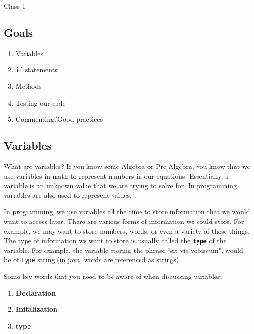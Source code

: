 \documentclass[11pt,fleqn]{article}
\begin{document}
\begin{center}
{\Huge
Class 1
}\\
\end{center}

\begin{center}
\section*{Goals}
\end{center}

\begin{enumerate}[1.]
\item
Variables

\item
\texttt{if} statements

\item 
Methods

\item
Testing our code

\item
Commenting/Good practices
\end{enumerate}

\begin{center}
\section*{Variables}
\end{center}

What are variables? If you know some Algebra or Pre-Algebra, you know that
we use variables in math to represent numbers in our equations. Essentially, a
variable is an unknown value that we are trying to solve for. In programming,
variables are also used to represent values. 

In programming, we use variables all the time to store information that we would
want to access later. There are various forms of information we could store. For
example, we may want to store numbers, words, or even a variety of these things.
The type of information we want to store is usually called the
\textbf{\texttt{type}} of the variable. For example, the variable storing the
phrase ``sit vis vobiscum", would be of \texttt{type} string (in java, words are
referenced as strings). 

Some key words that you need to be aware of when discussing variables:
\begin{enumerate}
\item
\textbf{Declaration}

\item
\textbf{Initalization}

\item
\textbf{type}
\end{enumerate}
\end{document}
